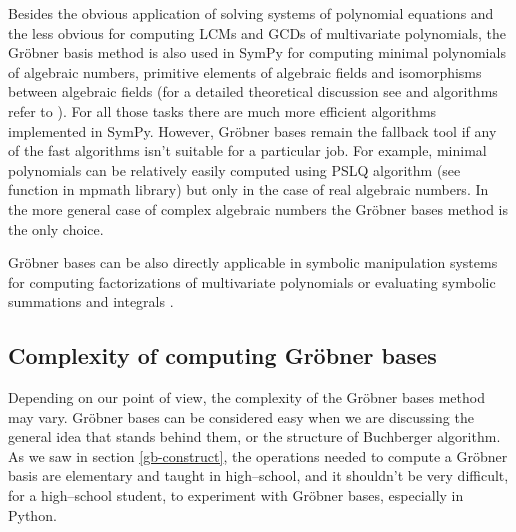 Besides the obvious application of solving systems of polynomial equations and the less obvious
for computing LCMs and GCDs of multivariate polynomials, the Gröbner basis method is also used
in SymPy for computing minimal polynomials of algebraic numbers, primitive elements of algebraic
fields and isomorphisms between algebraic fields (for a detailed theoretical discussion see
\cite{Adams1994intro} and algorithms refer to \cite{Cohen1993course}). For all those tasks there
are much more efficient algorithms implemented in SymPy. However, Gröbner bases remain the
fallback tool if any of the fast algorithms isn't suitable for a particular job. For example,
minimal polynomials can be relatively easily computed using PSLQ algorithm (see 
function in mpmath library) but only in the case of real algebraic numbers. In the more general
case of complex algebraic numbers the Gröbner bases method is the only choice.

Gröbner bases can be also directly applicable in symbolic manipulation systems for computing
factorizations of multivariate polynomials \cite{Gianni1985groebner} or evaluating symbolic summations
and integrals \cite{Chyzak1998groebner}.


\subsection{Complexity of computing Gröbner bases}

Depending on our point of view, the complexity of the Gröbner bases method may vary. Gröbner
bases can be considered easy when we are discussing the general idea that stands behind them, or
the structure of Buchberger algorithm. As we saw in section \ref{gb-construct}, the operations
needed to compute a Gröbner basis are elementary and taught in high--school, and it shouldn't be
very difficult, for a high--school student, to experiment with Gröbner bases, especially in Python.

